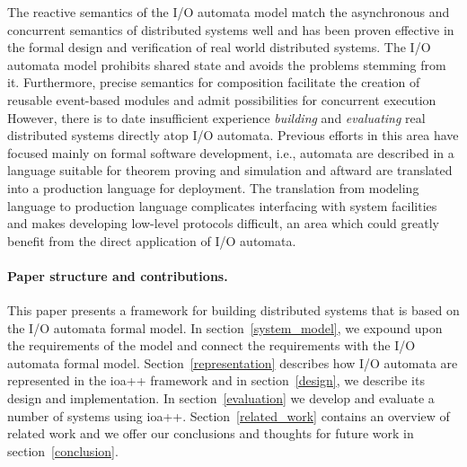 The reactive semantics of the I/O automata model match the asynchronous and concurrent semantics of distributed systems well and has been proven effective in the formal design and verification of real world distributed systems.
The I/O automata model prohibits shared state and avoids the problems stemming from it.
Furthermore, precise semantics for composition facilitate the creation of reusable event-based modules and admit possibilities for concurrent execution
However, there is to date insufficient experience \emph{building} and \emph{evaluating} real distributed systems directly atop I/O automata.
Previous efforts in this area have focused mainly on formal software development, i.e., automata are described in a language suitable for theorem proving and simulation and aftward are translated into a production language for deployment.
The translation from modeling language to production language complicates interfacing with system facilities and makes developing low-level protocols difficult, an area which could greatly benefit from the direct application of I/O automata.

\paragraph{Paper structure and contributions.}
This paper presents a framework for building distributed systems that is based on the I/O automata formal model.
In section~\ref{system_model}, we expound upon the requirements of the model and connect the requirements with the I/O automata formal model.
Section~\ref{representation} describes how I/O automata are represented in the ioa++ framework and in section~\ref{design}, we describe its design and implementation.
In section~\ref{evaluation} we develop and evaluate a number of systems using ioa++.
Section~\ref{related_work} contains an overview of related work and we offer our conclusions and thoughts for future work in section~\ref{conclusion}.

